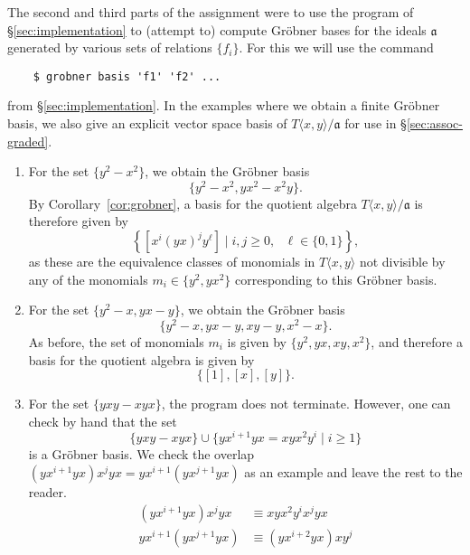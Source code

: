 The second and third parts of the assignment were to use the program of \S\ref{sec:implementation} to (attempt to) compute Gr\"obner bases for the ideals $\mathfrak{a}$ generated by various sets of relations $\{f_i\}$. For this we will use the command
\begin{verbatim}
	$ grobner basis 'f1' 'f2' ...
\end{verbatim}
from \S\ref{sec:implementation}. In the examples where we obtain a finite Gr\"obner basis, we also give an explicit vector space basis of $T\langle x, y\rangle / \mathfrak{a}$ for use in \S\ref{sec:assoc-graded}.

\begin{enumerate}
	\item For the set $\{y^2-x^2\}$, we obtain the Gr\"obner basis
	\begin{equation*}
		\{y^2-x^2,yx^2-x^2y\}.
	\end{equation*}
    By Corollary~\ref{cor:grobner}, a basis for the quotient algebra $T\langle x,y\rangle/\mathfrak{a}$ is therefore given by
    \begin{equation}
      \label{eqn:basisone}
    \left\{[x^i(yx)^jy^\ell]\mid i,j\ge 0,\text{ }\ell\in\{0,1\}\right\},
    \end{equation}
    as these are the equivalence classes of monomials in $T\langle x,y\rangle$ not divisible by any of the monomials $m_i\in\{y^2,yx^2\}$ corresponding to this Gr\"obner basis.
	\item For the set $\{y^2-x,yx-y\}$, we obtain the Gr\"obner basis
    \begin{equation*}
      \{y^2 - x,yx - y,xy - y,x^2 - x\}.
    \end{equation*}
    As before, the set of monomials $m_i$ is given by $\{y^2,yx,xy,x^2\}$, and therefore a basis for the quotient algebra is given by
    \begin{equation*}
      \{[1],[x],[y]\}.
    \end{equation*}
    \item\label{item:infinite-case-yxy} For the set $\{yxy-xyx\}$, the program does not terminate. However, one can check by hand that the set
    \[
    	\{yxy - xyx\} \cup \{yx^{i+1}yx = xyx^2 y^i \mid i \geq 1\}
    \]
    is a Gr\"obner basis. We check the overlap $(yx^{i+1}yx)x^j yx = yx^{i+1}(yx^{j+1}yx)$ as an example and leave the rest to the reader. 
    \begin{align*}
    	(yx^{i+1}yx)x^j yx &\equiv xyx^2 y^i x^j yx\\
    	yx^{i+1}(yx^{j+1}yx) &\equiv (yx^{i+2}yx)xy^j\\

\end{align*}
\end{enumerate}
